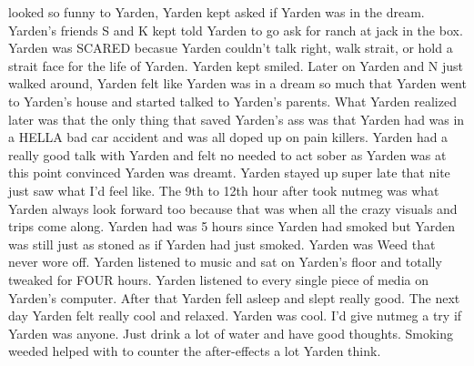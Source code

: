 \documentclass[12pt]{book}
\begin{document}
looked so funny to Yarden, Yarden kept asked if Yarden was in the dream. Yarden's friends S and K kept told Yarden to go ask for ranch at jack in the box. Yarden was SCARED becasue Yarden couldn't talk right, walk strait, or hold a strait face for the life of Yarden. Yarden kept smiled. Later on Yarden and N just walked around, Yarden felt like Yarden was in a dream so much that Yarden went to Yarden's house and started talked to Yarden's parents. What Yarden realized later was that the only thing that saved Yarden's ass was that Yarden had was in a HELLA bad car accident and was all doped up on pain killers. Yarden had a really good talk with Yarden and felt no needed to act sober as Yarden was at this point convinced Yarden was dreamt. Yarden stayed up super late that nite just saw what I'd feel like. The 9th to 12th hour after took nutmeg was what Yarden always look forward too because that was when all the crazy visuals and trips come along. Yarden had was 5 hours since Yarden had smoked but Yarden was still just as stoned as if Yarden had just smoked. Yarden was Weed that never wore off. Yarden listened to music and sat on Yarden's floor and totally tweaked for FOUR hours. Yarden listened to every single piece of media on Yarden's computer. After that Yarden fell asleep and slept really good. The next day Yarden felt really cool and relaxed. Yarden was cool. I'd give nutmeg a try if Yarden was anyone. Just drink a lot of water and have good thoughts. Smoking weeded helped with to counter the after-effects a lot Yarden think.
\end{document}
